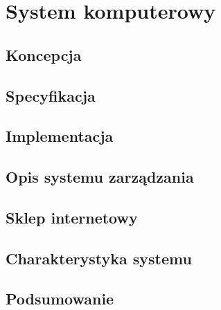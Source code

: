 \section{System komputerowy}
		\subsection{Koncepcja}
					
		\subsection{Specyfikacja}
							
		\subsection{Implementacja}
							
		\subsection{Opis systemu zarządzania}	
							
		\subsection{Sklep internetowy}	
			
		\subsection{Charakterystyka systemu}
							
		\subsection{Podsumowanie}
			
